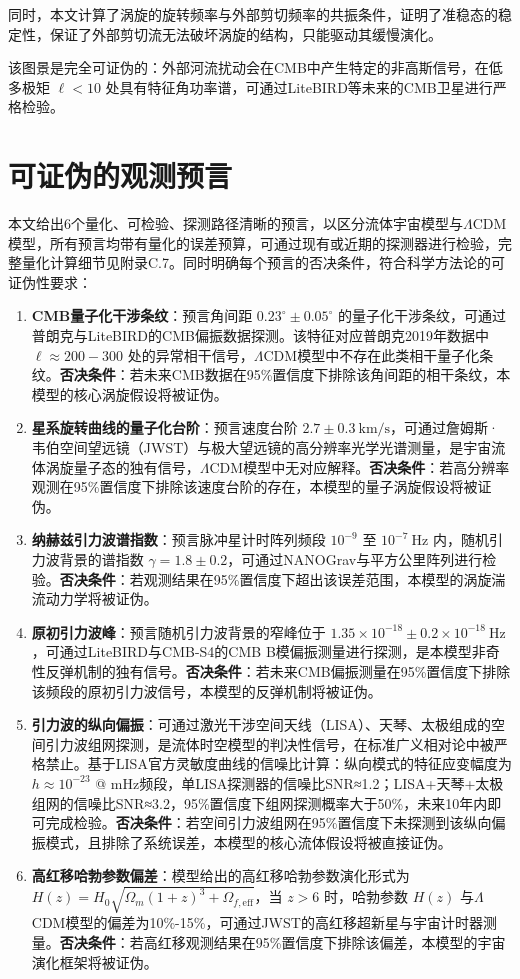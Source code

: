 \documentclass[aps,prd,preprint,superscriptaddress,floatfix]{revtex4-2}
\begin{document}
同时，本文计算了涡旋的旋转频率与外部剪切频率的共振条件，证明了准稳态的稳定性，保证了外部剪切流无法破坏涡旋的结构，只能驱动其缓慢演化。

该图景是完全可证伪的：外部河流扰动会在CMB中产生特定的非高斯信号，在低多极矩 $\ell<10$ 处具有特征角功率谱，可通过LiteBIRD等未来的CMB卫星进行严格检验。

\section{可证伪的观测预言}
本文给出6个量化、可检验、探测路径清晰的预言，以区分流体宇宙模型与$\Lambda$CDM模型，所有预言均带有量化的误差预算，可通过现有或近期的探测器进行检验，完整量化计算细节见附录C.7。同时明确每个预言的否决条件，符合科学方法论的可证伪性要求：

\begin{enumerate}
    \item \textbf{CMB量子化干涉条纹}：预言角间距 $0.23^\circ \pm 0.05^\circ$ 的量子化干涉条纹，可通过普朗克与LiteBIRD的CMB偏振数据探测。该特征对应普朗克2019年数据中 $\ell \approx 200-300$ 处的异常相干信号，$\Lambda$CDM模型中不存在此类相干量子化条纹。\textbf{否决条件}：若未来CMB数据在95\%置信度下排除该角间距的相干条纹，本模型的核心涡旋假设将被证伪。
    \item \textbf{星系旋转曲线的量子化台阶}：预言速度台阶 $2.7 \pm 0.3 \ \text{km/s}$，可通过詹姆斯·韦伯空间望远镜（JWST）与极大望远镜的高分辨率光学光谱测量，是宇宙流体涡旋量子态的独有信号，$\Lambda$CDM模型中无对应解释。\textbf{否决条件}：若高分辨率观测在95\%置信度下排除该速度台阶的存在，本模型的量子涡旋假设将被证伪。
    \item \textbf{纳赫兹引力波谱指数}：预言脉冲星计时阵列频段 $10^{-9}$ 至 $10^{-7} \ \text{Hz}$ 内，随机引力波背景的谱指数 $\gamma=1.8 \pm 0.2$，可通过NANOGrav与平方公里阵列进行检验。\textbf{否决条件}：若观测结果在95\%置信度下超出该误差范围，本模型的涡旋湍流动力学将被证伪。
    \item \textbf{原初引力波峰}：预言随机引力波背景的窄峰位于 $1.35 \times 10^{-18} \pm 0.2 \times 10^{-18} \ \text{Hz}$，可通过LiteBIRD与CMB-S4的CMB B模偏振测量进行探测，是本模型非奇性反弹机制的独有信号。\textbf{否决条件}：若未来CMB偏振测量在95\%置信度下排除该频段的原初引力波信号，本模型的反弹机制将被证伪。
    \item \textbf{引力波的纵向偏振}：可通过激光干涉空间天线（LISA）、天琴、太极组成的空间引力波组网探测，是流体时空模型的判决性信号，在标准广义相对论中被严格禁止。基于LISA官方灵敏度曲线的信噪比计算：纵向模式的特征应变幅度为 $h \approx 10^{-23}$ @ mHz频段，单LISA探测器的信噪比SNR≈1.2；LISA+天琴+太极组网的信噪比SNR≈3.2，95\%置信度下组网探测概率大于50\%，未来10年内即可完成检验。\textbf{否决条件}：若空间引力波组网在95\%置信度下未探测到该纵向偏振模式，且排除了系统误差，本模型的核心流体假设将被直接证伪。
    \item \textbf{高红移哈勃参数偏差}：模型给出的高红移哈勃参数演化形式为 $H(z)=H_{0} \sqrt{\Omega_{m}(1+z)^{3}+\Omega_{f, \mathrm{eff}}}$，当 $z>6$ 时，哈勃参数 $H(z)$ 与$\Lambda$CDM模型的偏差为10\%-15\%，可通过JWST的高红移超新星与宇宙计时器测量。\textbf{否决条件}：若高红移观测结果在95\%置信度下排除该偏差，本模型的宇宙演化框架将被证伪。
\end{enumerate}
\end{document}
